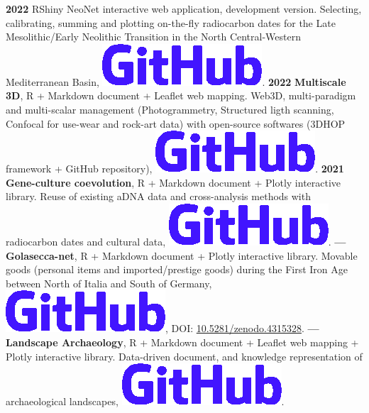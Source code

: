\documentclass{article}
\begin{document}
\textbf{2022 }\textsf{RShiny} NeoNet interactive web application, development version. Selecting, calibrating, summing and plotting on-the-fly radiocarbon dates for the Late Mesolithic/Early Neolithic Transition in the North Central-Western Mediterranean Basin, \href{https://github.com/zoometh/neonet#neonet-app--development-version-}{\includegraphics[scale=0.12]{github-rect.png}}.
\smallbreak
\textbf{2022 }\textbf{Multiscale 3D}, \textsf{R} + \textsf{Markdown} document + \textsf{Leaflet} web mapping. Web3D, multi-paradigm and multi-scalar management (Photogrammetry, Structured ligth scanning, Confocal for use-wear and rock-art data) with open-source softwares (\textsf{3DHOP} framework + \textsf{GitHub} repository), \href{https://zoometh.github.io/rockart/}{\includegraphics[scale=0.12]{github-rect.png}}.
\smallbreak
\textbf{2021 }\textbf{Gene-culture coevolution}, \textsf{R} + \textsf{Markdown} document + \textsf{Plotly} interactive library. Reuse of existing aDNA data and cross-analysis methods with radiocarbon dates and cultural data, \href{https://zoometh.github.io/aDNA/}{\includegraphics[scale=0.12]{github-rect.png}}.
\smallbreak
\textbf{--- }\textbf{Golasecca-net}, \textsf{R} + \textsf{Markdown} document + \textsf{Plotly} interactive library. Movable goods (personal items and imported/prestige goods) during the First Iron Age between North of Italia and South of Germany, \href{https://zoometh.github.io/golasecca/}{\includegraphics[scale=0.12]{github-rect.png}}, DOI: \href{https://doi.org/10.5281/zenodo.4315328}{10.5281/zenodo.4315328}.
\smallbreak
\textbf{--- }\textbf{Landscape Archaeology}, \textsf{R} + \textsf{Markdown} document + \textsf{Leaflet} web mapping + \textsf{Plotly} interactive library. Data-driven document, and knowledge representation of archaeological landscapes, \href{https://zoometh.github.io/popland}{\includegraphics[scale=0.12]{github-rect.png}}.
\end{document}
